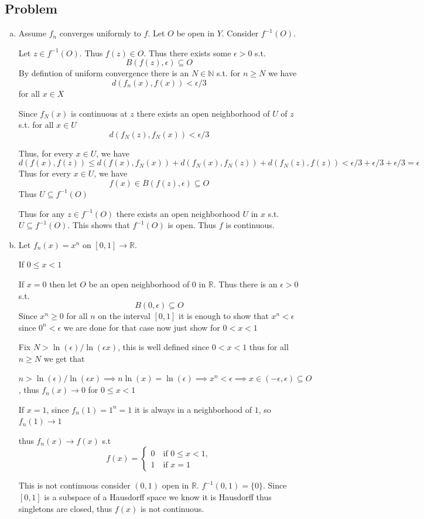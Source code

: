 \documentclass[12pt, letterpaper]{article}
\newcounter{problem}
\newcommand{\q}{
    \newpage %
    \stepcounter{problem} %
    \subsection*{Problem \arabic{problem}} %
}
\newcommand{\R}{\mathbb{R}}
\newcommand{\N}{\mathbb{N}}
\renewcommand{\t}[1]{\text{#1}}
\begin{document}
\q
\begin{enumerate}[(a)]
    \item Assume $f_n$ converges uniformly to $f$. Let $O$ be open in $Y$. Consider $f^{-1}(O)$.
    
    Let $z \in f^{-1}(O)$. Thus $f(z) \in O$. Thus there exists some $\epsilon > 0$ s.t.
    \[B(f(z), \epsilon) \subseteq O\]
    By defintion of uniform convergence there is an $N \in \N$ s.t. for $n \geq N$ we have
    \[d(f_n(x),f(x)) < \epsilon/3\]
    for all $x \in X$

    Since $f_N(x)$ is continuous at $z$ there exists an open neighborhood of $U$ of $z$ s.t. for all $x \in U$
    \[d(f_N(z),f_N(x)) < \epsilon/3\]

    Thus, for every $x \in U$, we have
    \[d(f(x),f(z)) \leq d(f(x),f_N(x))+d(f_N(x),f_N(z))+d(f_N(z),f(z)) < \epsilon/3+\epsilon/3+\epsilon/3=\epsilon\]
    Thus for every $x \in U$, we have
    \[f(x) \in B(f(z),\epsilon) \subseteq O\]
    Thus $U \subseteq f^{-1}(O)$

    Thus for any $z \in f^{-1}(O)$  there exists an open neighborhood $U$ in $x$ s.t. $U \subseteq f^{-1}(O)$. This shows that $f^{-1}(O)$ is open. Thus $f$ is continuous.

    \item Let $f_n(x)=x^n$ on $[0,1] \to \R$.
    
    If $0 \leq x < 1$

    If $x=0$ then let $O$ be an open neighborhood of $0$ in $\R$. Thus there is an $\epsilon > 0$ s.t. 
    \[B(0,\epsilon) \subseteq O\]
    Since $x^n \geq 0$ for all $n$ on the interval $[0,1]$ it is enough to show that $x^n < \epsilon$ since $0^n < \epsilon$ we are done for that case now just show for $0 < x < 1$
    
    Fix $N > \ln(\epsilon)/\ln(\epsilon x)$, this is well defined since $0 < x < 1$ thus for all $n \geq N$ we get that

    $n > \ln(\epsilon)/\ln(\epsilon x) \implies n \ln(x) = \ln(\epsilon) \implies x^n < \epsilon \implies x \in (-\epsilon, \epsilon) \subseteq O$, thus $f_n(x) \to 0$ for $0 \leq x < 1$

    If $x=1$, since $f_n(1)=1^n=1$ it is always in a neighborhood of $1$, so $f_n(1) \to 1$

    thus $f_n(x) \to f(x)$ s.t
    \begin{equation*}
        f(x)=\begin{cases*}
            0 \quad \t{if } 0 \leq x < 1,\\
            1 \quad \t{if } x=1
        \end{cases*}
    \end{equation*}

    This is not continuous consider $(0,1)$ open in $\R$. $f^{-1}(0,1)=\{0\}$. Since $[0,1]$ is a subspace of a Hausdorff space we know it is Hausdorff thus singletons are closed, thus $f(x)$ is not continuous.
\end{enumerate}
\end{document}
